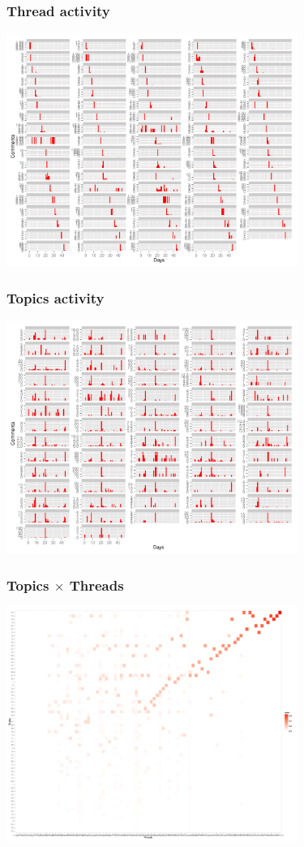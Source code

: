 \documentclass{beamer}
\begin{document}
\begin{frame}\frametitle{Thread activity}
  \begin{center}
    \includegraphics[width=9.5cm]{./imgs/DT_timebythread.pdf}
  \end{center}
\end{frame}

\begin{frame}\frametitle{Topics activity}
  \begin{center}
    \includegraphics[width=9.5cm]{./imgs/DT_timebycluster.pdf}
  \end{center}
\end{frame}

\begin{frame}\frametitle{Topics $\times$ Threads}
  \begin{center}
    \includegraphics[width=9.5cm]{./imgs/DT_gg_heat.pdf}
  \end{center}
\end{frame}
\end{document}
